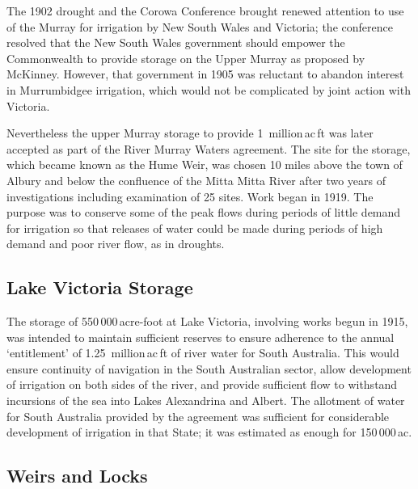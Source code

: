 The 1902 drought and the Corowa Conference brought renewed attention
to use of the Murray for irrigation by New South Wales and Victoria;
the conference resolved that the New South Wales government should
empower the Commonwealth to provide storage on the Upper Murray as
proposed by McKinney.  However, that government in 1905 was reluctant
to abandon interest in Murrumbidgee irrigation, which would not be
complicated by joint action with Victoria.

Nevertheless the upper Murray storage to provide 1~million\,ac\,ft was
later accepted as part of the River Murray Waters agreement. The site
for the storage, which became known as the Hume Weir, was chosen 10
miles above the town of Albury and below the confluence of the Mitta
Mitta River after two years of investigations including examination of
25 sites.  Work began
in 1919.  The purpose was to conserve some of the peak flows during
periods of little demand for irrigation so that releases of water
could be made during periods of high demand and poor river flow, as in
droughts.

\subsection*{Lake Victoria Storage}

The storage of 550\,000\,acre-foot at Lake Victoria, involving works
begun in 1915, was intended to maintain sufficient reserves to ensure
adherence to the annual `entitlement' of 1.25~million\,ac\,ft of river
water for South Australia.  This would ensure continuity of navigation
in the South Australian sector, allow development of irrigation on
both sides of the river, and provide sufficient flow to withstand
incursions of the sea into Lakes Alexandrina and Albert.  The
allotment of water for South Australia provided by the agreement was
sufficient for considerable development of irrigation in that State;
it was estimated as enough for 150\,000\,ac.

\subsection*{Weirs and Locks}

